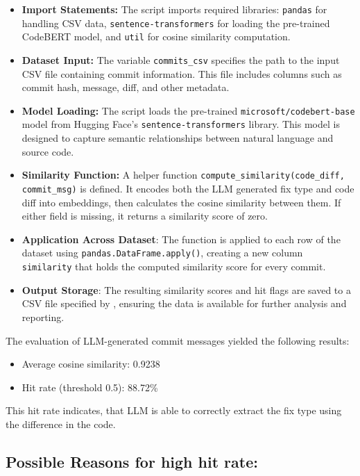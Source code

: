 \documentclass[12pt,a4paper]{article}
\begin{document}
\begin{itemize}
    \item \textbf{Import Statements:} The script imports required libraries: \texttt{pandas} for handling CSV data, \texttt{sentence-transformers} for loading the pre-trained CodeBERT model, and \texttt{util} for cosine similarity computation.
    \item \textbf{Dataset Input:} The variable \texttt{commits\_csv} specifies the path to the input CSV file containing commit information. This file includes columns such as commit hash, message, diff, and other metadata.
    \item \textbf{Model Loading:} The script loads the pre-trained \texttt{microsoft/codebert-base} model from Hugging Face’s \texttt{sentence-transformers} library. This model is designed to capture semantic relationships between natural language and source code.
    \item \textbf{Similarity Function:} A helper function \texttt{compute\_similarity(code\_diff, commit\_msg)} is defined. It encodes both the LLM generated fix type and code diff into embeddings, then calculates the cosine similarity between them. If either field is missing, it returns a similarity score of zero.
    \item \textbf{Application Across Dataset}: The function is applied to each row of the dataset using \texttt{pandas.DataFrame.apply()}, creating a new column \texttt{similarity} that holds the computed similarity score for every commit.
    \item \textbf{Output Storage}: The resulting similarity scores and hit flags are saved to a CSV file specified by \texttt{}, ensuring the data is available for further analysis and reporting.
\end{itemize}

The evaluation of LLM-generated commit messages yielded the following results:

\begin{itemize}
    \item Average cosine similarity: 0.9238
    \item Hit rate (threshold 0.5): 88.72\%
\end{itemize}

This hit rate indicates, that LLM is able to correctly extract the fix type using the difference in the code. 

\subsection{Possible Reasons for high hit rate:}
\end{document}
